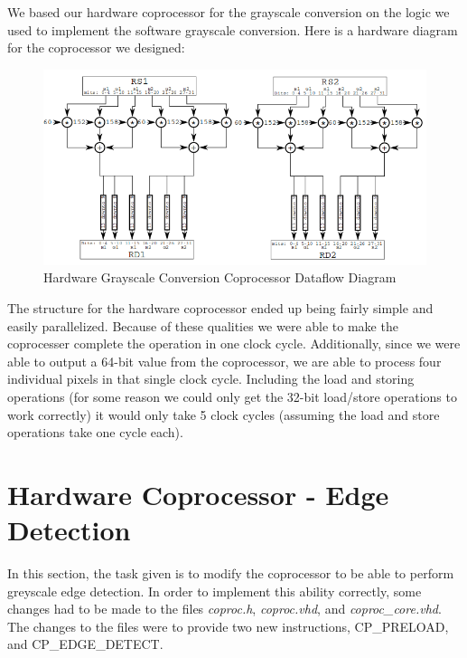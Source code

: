 \documentclass{article}
\begin{document}
We based our hardware coprocessor for the grayscale conversion on the logic we used to implement the software grayscale conversion. Here is a hardware diagram for the coprocessor we designed:

	 \begin{figure}[H]
	 	\begin{center}
	 		\includegraphics[scale=0.6]{../part5_files/Grayscale_coprocessor_dataflow.png}
	 		\caption{Hardware Grayscale Conversion Coprocessor Dataflow Diagram}
	 	\end{center}
	 \end{figure}

The structure for the hardware coprocessor ended up being fairly simple and easily parallelized. Because of these qualities we were able to make the coprocesser complete the operation in one clock cycle. Additionally, since we were able to output a 64-bit value from the coprocessor, we are able to process four individual pixels in that single clock cycle. Including the load and storing operations (for some reason we could only get the 32-bit load/store operations to work correctly) it would only take 5 clock cycles (assuming the load and store operations take one cycle each).

\section{Hardware Coprocessor - Edge Detection}
In this section, the task given is to modify the coprocessor to be able to perform greyscale edge detection. In order to implement this ability correctly, some changes had to be made to the files \textit{coproc.h}, \textit{coproc.vhd}, and \textit{coproc\_core.vhd}. The changes to the files were to provide two new instructions, CP\_PRELOAD, and CP\_EDGE\_DETECT. \\
\end{document}
